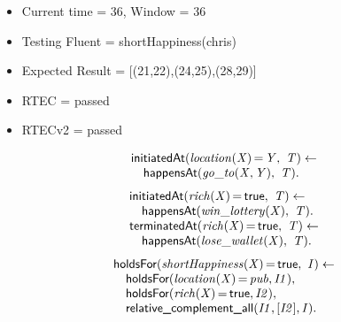 \documentclass[8pt]{beamer}
\DeclareMathOperator{\val}{=}  %
\def \patsize {}
\def\happensAt{\textsf{\patsize happensAt}}
\def\holdsFor{\textsf{\patsize holdsFor}}
\def\initiatedAt{\textsf{\patsize initiatedAt}}
\def\terminatedAt{\textsf{\patsize terminatedAt}}
\def\complementall{\textsf{\patsize relative\_complement\_all}}
\def\true{\textsf{\patsize true}}
\newenvironment{mysplit}%
  {\arraycolsep 0pt \begin{array}{l}}%
  {\end{array}}
\begin{document}
\begin{frame}
\begin{minipage}{0.48\linewidth}
        \begin{itemize}
            \item Current time = 36, Window = 36
            \item Testing Fluent = shortHappiness(chris)
            \item Expected Result = [(21,22),(24,25),(28,29)]
            \item RTEC = passed
            \item RTECv2 = passed
        \end{itemize}
    \end{minipage}
    \begin{minipage}{0.48\linewidth}

        \begin{align*}
            \begin{mysplit}
                \initiatedAt\mathit{(location(X)\val Y,\ T) \leftarrow}\\
                \quad    \happensAt\mathit{(go\_to(X,Y),\ T).}
            \end{mysplit}
        \end{align*}
        \begin{align*}
            \begin{mysplit}
                \initiatedAt\mathit{(rich(X)\val\true,\ T) \leftarrow}\\
                \quad    \happensAt\mathit{(win\_lottery(X),\ T).}\\
                \terminatedAt\mathit{(rich(X)\val\true,\ T) \leftarrow}\\
                \quad    \happensAt\mathit{(lose\_wallet(X),\ T)}.\\
            \end{mysplit}
        \end{align*}
        \begin{align*}
            \begin{mysplit}
                \holdsFor\mathit{(shortHappiness(X)\val\true,\ I) \leftarrow}\\
                \quad    \holdsFor\mathit{(location(X)\val pub,I1)},\\
                \quad    \holdsFor\mathit{(rich(X)\val\true,I2)},\\
                \quad    \complementall\mathit{(I1,[I2],I)}.\\
            \end{mysplit}
        \end{align*}
    \end{minipage}

\end{frame}
\end{document}
